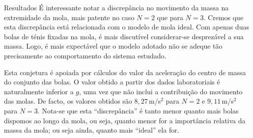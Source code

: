 \documentclass[final]{beamer}
\newlength{\colwidth}
\begin{document}
\begin{frame}[t]
\begin{columns}[t]
\begin{column}{\colwidth}
\begin{block}{Resultados}
É interessante notar a discrepância no movimento da massa na extremidade
da mola, mais patente no caso $N=2$ que para $N=3$. Cremos que esta discrepância
está relacionada com o modelo de mola ideal. Com apenas duas bolas de ténis
fixadas na mola, é mais discutível considerar-se desprezável a sua massa. Logo,
é mais expectável que o modelo adotado não se adeque tão precisamente ao
comportamento do sistema estudado.

Esta conjetura é apoiada por cálculos do valor da aceleração do centro de massa
do conjunto das bolas. O valor obtido a partir dos dados laboratoriais é
naturalmente inferior a $g$, uma vez que não inclui a contribuição do movimento
das molas. De facto, os valores obtidos são $8,27$\,m/s$^2$ para $N=2$ e
$9,11$\,m/s$^2$ para $N=3$.  Nota-se que esta ``discrepância'' é tanto menor
quanto mais bolas dispomos ao longo da mola, ou seja, quanto menor for a
importância relativa da massa da mola; ou seja ainda, quanto mais ``ideal'' ela
for.
	

\end{block}
\end{column}
\end{columns}
\end{frame}
\end{document}
